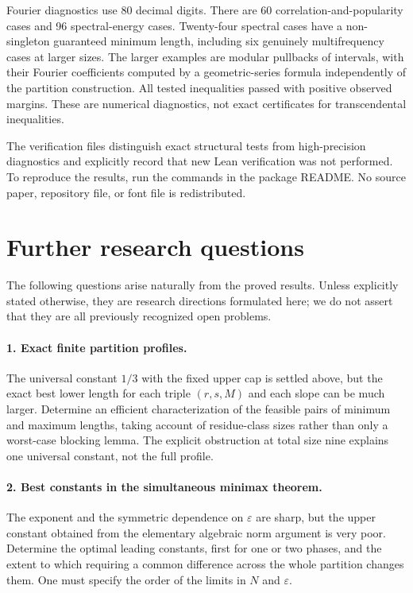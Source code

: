\documentclass[11pt,letterpaper]{article}
\numberwithin{equation}{section}
\theoremstyle{definition}
\theoremstyle{remark}
\newcommand{\1}{\mathbf 1}
\newcommand{\eps}{\varepsilon}
\newcommand{\srctag}[1]{\texorpdfstring{\enspace\textup{[#1]}}{ [#1]}}
\newcommand{\srcnote}[2]{\par\noindent{\small\textit{Source #1, delivered #2.}}\par}
\begin{document}
Fourier diagnostics use 80 decimal digits. There are 60 correlation-and-popularity cases and 96 spectral-energy cases. Twenty-four spectral cases have a non-singleton guaranteed minimum length, including six genuinely multifrequency cases at larger sizes. The larger examples are modular pullbacks of intervals, with their Fourier coefficients computed by a geometric-series formula independently of the partition construction. All tested inequalities passed with positive observed margins. These are numerical diagnostics, not exact certificates for transcendental inequalities.

The verification files distinguish exact structural tests from high-precision diagnostics and explicitly record that new Lean verification was not performed. To reproduce the results, run the commands in the package README. No source paper, repository file, or font file is redistributed.

\section[{Further research questions\srctag{05}}]{Further research questions}\label{gsr:fz:05:sec:d9}
\srcnote{05}{Section 9}
\label{gsr:fz:05:sec:questions}
The following questions arise naturally from the proved results. Unless explicitly stated otherwise, they are research directions formulated here; we do not assert that they are all previously recognized open problems.

\paragraph{1. Exact finite partition profiles.}
The universal constant $1/3$ with the fixed upper cap is settled above, but the exact best lower length for each triple $(r,s,M)$ and each slope can be much larger. Determine an efficient characterization of the feasible pairs of minimum and maximum lengths, taking account of residue-class sizes rather than only a worst-case blocking lemma. The explicit obstruction at total size nine explains one universal constant, not the full profile.

\paragraph{2. Best constants in the simultaneous minimax theorem.}
The exponent and the symmetric dependence on $\eps$ are sharp, but the upper constant obtained from the elementary algebraic norm argument is very poor. Determine the optimal leading constants, first for one or two phases, and the extent to which requiring a common difference across the whole partition changes them. One must specify the order of the limits in $N$ and $\eps$.
\end{document}
